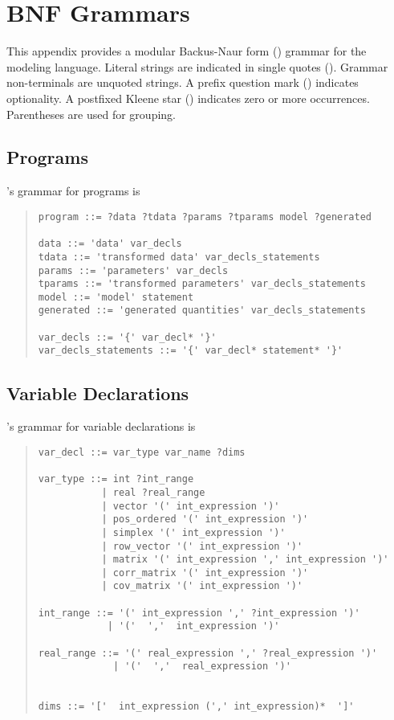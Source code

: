 \chapter{BNF Grammars}

This appendix provides a modular Backus-Naur form (\BNF) grammar for
the \Stan modeling language.  Literal strings are indicated in single
quotes ().  Grammar non-terminals are unquoted strings.  A
prefix question mark () indicates optionality.  A postfixed
Kleene star (\code{*}) indicates zero or more occurrences.
Parentheses are used for grouping.

\section{Programs}

\Stan's grammar for programs is
%
\begin{quote}
\begin{Verbatim}
program ::= ?data ?tdata ?params ?tparams model ?generated

data ::= 'data' var_decls
tdata ::= 'transformed data' var_decls_statements
params ::= 'parameters' var_decls
tparams ::= 'transformed parameters' var_decls_statements
model ::= 'model' statement
generated ::= 'generated quantities' var_decls_statements

var_decls ::= '{' var_decl* '}'
var_decls_statements ::= '{' var_decl* statement* '}'
\end{Verbatim}
\end{quote}

\section{Variable Declarations}

\Stan's grammar for variable declarations is
%
\begin{quote}
\begin{Verbatim}
var_decl ::= var_type var_name ?dims

var_type ::= int ?int_range
           | real ?real_range
           | vector '(' int_expression ')'
           | pos_ordered '(' int_expression ')'
           | simplex '(' int_expression ')'
           | row_vector '(' int_expression ')'
           | matrix '(' int_expression ',' int_expression ')'
           | corr_matrix '(' int_expression ')'
           | cov_matrix '(' int_expression ')'

int_range ::= '(' int_expression ',' ?int_expression ')'
            | '('  ','  int_expression ')'

real_range ::= '(' real_expression ',' ?real_expression ')'
             | '('  ','  real_expression ')'


dims ::= '['  int_expression (',' int_expression)*  ']'
\end{Verbatim}
\end{quote}

